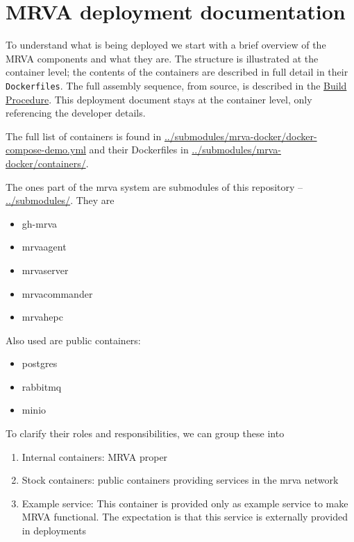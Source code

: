 \documentclass[11pt]{article}
\author{Michael Hohn}
\date{\today}
\title{}
\begin{document}
\tableofcontents

\section{MRVA deployment documentation}
\label{sec:orgfc0bd4b}
To understand what is being deployed we start with a brief overview of the MRVA
components and what they are.  The structure is illustrated at the container
level; the contents of the containers are described in full detail in their
\texttt{Dockerfiles}.  The full assembly sequence, from source, is described in the
\hyperref[sec:org6f1c38a]{Build Procedure}.  This deployment document stays at the container level, only
referencing the developer details.

The full list of containers is found in \url{../submodules/mrva-docker/docker-compose-demo.yml}
and their Dockerfiles in \url{../submodules/mrva-docker/containers/}.

The ones part of the mrva system are submodules of this repository --
\url{../submodules/}. They are
\begin{itemize}
\item gh-mrva
\item mrvaagent
\item mrvaserver
\item mrvacommander
\item mrvahepc
\end{itemize}

Also used are public containers:
\begin{itemize}
\item postgres
\item rabbitmq
\item minio
\end{itemize}

To clarify their roles and responsibilities, we can group these into
\begin{enumerate}
\item Internal containers:  MRVA proper
\item Stock containers: public containers providing services in the mrva network
\item Example service: This container is provided only as example service to make
MRVA functional.  The expectation is that this service is externally
provided in deployments
\end{enumerate}
\end{document}
